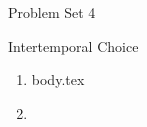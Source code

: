 \documentclass{handout}
\begin{document}
\centerline{\Large Problem Set 4}
\centerline{\large Intertemporal Choice}


\begin{enumerate} 
\item {body.tex}
\item 
\end{enumerate}


\end{document}

